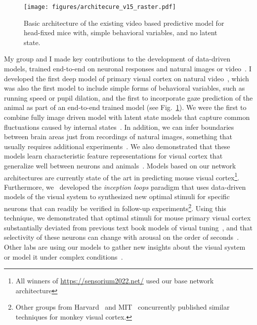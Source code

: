 \documentclass[B2,COG]{ercgrant}
\begin{document}
\begin{figure}
\texttt{[image: figures/architecure\_v15\_raster.pdf]}
\caption{Basic architecture of the existing video based predictive model for head-fixed mice with, simple behavioral variables, and no latent state.}
\label{fig:videomodel}
\end{figure}
My group and I made key contributions to the development of data-driven models, trained end-to-end on neuronal responses and natural images or video~\parencite{Sinz2018-sk, Walker2019-yw, Lurz2020-ua, Bashiri2021-or, Lurz2022-up, Franke2022-do, Cobos2022-rr, Ecker2018-gz,Cadena2019-jw}. 
I developed the first deep model of primary visual cortex on natural video~\parencite{Sinz2018-sk}, which was also the first model to include simple forms of behavioral variables, such as running speed or pupil dilation, and the first to incorporate gaze prediction of the animal as part of an end-to-end trained model (see Fig.~\ref{fig:videomodel}). 
We were the first to combine fully image driven model with latent state models that capture common fluctuations caused by internal states~\parencite{Bashiri2021-or}.
In addition, we can infer boundaries between brain areas just from recordings of natural images, something that usually requires additional experiments~\parencite{Bashiri2021-or}.
We also demonstrated that these models learn characteristic feature representations for visual cortex that generalize well between neurons and animals~\parencite{Lurz2020-ua,Cobos2022-rr}.
Models based on our network architectures are currently state of the art in predicting mouse visual cortex\footnote{All winners of  \url{https://sensorium2022.net/} used our base network architecture}. 
Furthermore, we~\parencite{Walker2019-yw} developed the \textit{inception loops} paradigm that uses data-driven models of the visual system to synthesized new optimal stimuli for specific neurons that can readily be verified in follow-up experiments\footnote{Other groups from Harvard~\parencite{Ponce2019-yn} and MIT~\parencite{Bashivan2019-ry} concurrently published similar techniques for monkey visual cortex.}. 
Using this technique, we demonstrated that optimal stimuli for mouse primary visual cortex substantially deviated from previous text book models of visual tuning~\parencite{Hubel1959-zs}, and that selectivity of these neurons can change with arousal on the order of seconds~\parencite{Franke2022-do}.
Other labs are using our models to gather new insights about the visual system~\parencite{Hofling2022-wr} or model it under complex conditions~\parencite{Parker2022-ac}.
\end{document}
